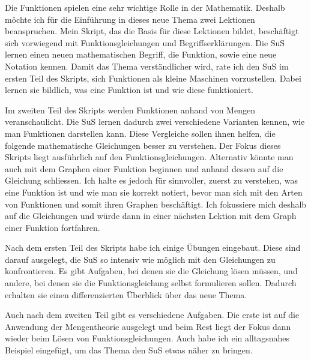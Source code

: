 \documentclass[
  10pt,
  a4paper,
  DIV=11]{scrartcl}
\theoremstyle{definition}
\theoremstyle{remark}
\begin{document}
\begin{tcolorbox}[enhanced jigsaw, left=2mm, colbacktitle=quarto-callout-note-color!10!white, bottomtitle=1mm, leftrule=.75mm, coltitle=black, breakable, opacitybacktitle=0.6, opacityback=0, arc=.35mm, toptitle=1mm, rightrule=.15mm, colback=white, title=\textcolor{quarto-callout-note-color}{\faInfo}\hspace{0.5em}{Hinweis}, colframe=quarto-callout-note-color-frame, titlerule=0mm, bottomrule=.15mm, toprule=.15mm]

Die Funktionen spielen eine sehr wichtige Rolle in der Mathematik.
Deshalb möchte ich für die Einführung in dieses neue Thema zwei
Lektionen beanspruchen. Mein Skript, das die Basis für diese Lektionen
bildet, beschäftigt sich vorwiegend mit Funktionsgleichungen und
Begriffserklärungen. Die SuS lernen einen neuen mathematischen Begriff,
die Funktion, sowie eine neue Notation kennen. Damit das Thema
verständlicher wird, rate ich den SuS im ersten Teil des Skripts, sich
Funktionen als kleine Maschinen vorzustellen. Dabei lernen sie bildlich,
was eine Funktion ist und wie diese funktioniert.

Im zweiten Teil des Skripts werden Funktionen anhand von Mengen
veranschaulicht. Die SuS lernen dadurch zwei verschiedene Varianten
kennen, wie man Funktionen darstellen kann. Diese Vergleiche sollen
ihnen helfen, die folgende mathematische Gleichungen besser zu
verstehen. Der Fokus dieses Skripts liegt ausführlich auf den
Funktionsgleichungen. Alternativ könnte man auch mit dem Graphen einer
Funktion beginnen und anhand dessen auf die Gleichung schliessen. Ich
halte es jedoch für sinnvoller, zuerst zu verstehen, was eine Funktion
ist und wie man sie korrekt notiert, bevor man sich mit den Arten von
Funktionen und somit ihren Graphen beschäftigt. Ich fokussiere mich
deshalb auf die Gleichungen und würde dann in einer nächsten Lektion mit
dem Graph einer Funktion fortfahren.

Nach dem ersten Teil des Skripts habe ich einige Übungen eingebaut.
Diese sind darauf ausgelegt, die SuS so intensiv wie möglich mit den
Gleichungen zu konfrontieren. Es gibt Aufgaben, bei denen sie die
Gleichung lösen müssen, und andere, bei denen sie die Funktionsgleichung
selbst formulieren sollen. Dadurch erhalten sie einen differenzierten
Überblick über das neue Thema.

Auch nach dem zweiten Teil gibt es verschiedene Aufgaben. Die erste ist
auf die Anwendung der Mengentheorie ausgelegt und beim Rest liegt der
Fokus dann wieder beim Lösen von Funktionsgleichungen. Auch habe ich ein
alltagsnahes Beispiel eingefügt, um das Thema den SuS etwas näher zu
bringen.


\end{tcolorbox}
\end{document}

